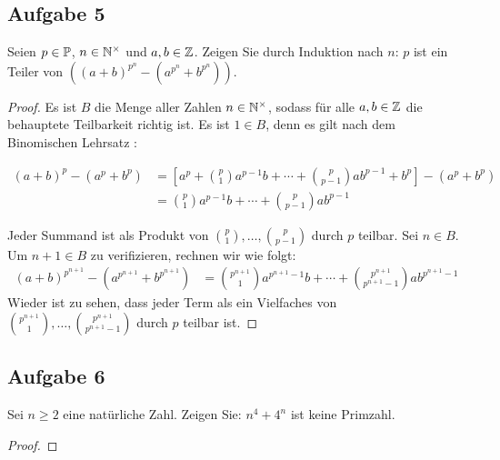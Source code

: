 \subsection{Aufgabe 5}
Seien $p \in \mathbb{P}{}$, $n \in \mathbb{N}^\times{}$ und $a,b \in \mathbb{Z}{}$. Zeigen Sie durch Induktion
nach $n$: $p$ ist ein Teiler von
$((a + b)^{p^n} - (a^{p^n} + b^{p^n}))$.
\begin{proof}
  Es ist $B$ die Menge aller Zahlen $n \in \mathbb{N}^\times{}$,
  sodass für alle $a,b \in \mathbb{Z}{}$ die behauptete Teilbarkeit richtig ist.
  Es ist $1 \in B$, denn es gilt nach dem Binomischen Lehrsatz
  \parencite[19]{book:zahlentheorie}:
  \begin{widemath}
    \begin{equation*}
      \begin{aligned}
        (a + b)^p - (a^p + b^p) & =
        \left[a^p + \binom{p}{1}a^{p-1}b + \dotsb + \binom{p}{p - 1}ab^{p-1} + b^p\right] - (a^p + b^p) \\
                                & = \binom{p}{1}a^{p-1}b + \dotsb + \binom{p}{p - 1}ab^{p-1}
      \end{aligned}
    \end{equation*}
  \end{widemath}
  Jeder Summand ist als Produkt von $\binom{p}{1},\dotsc,\binom{p}{p - 1}$ durch $p$ teilbar.
  Sei $n \in B$. Um $n + 1 \in B$ zu verifizieren, rechnen wir wie folgt:
  \begin{equation*}
    \begin{aligned}
      (a + b)^{p^{n+1}} - (a^{p^{n+1}} + b^{p^{n+1}}) & =
      \binom{p^{n+1}}{1}a^{p^{n+1}-1}b + \dotsb + \binom{p^{n+1}}{p^{n+1} - 1}ab^{p^{n+1}-1}
    \end{aligned}
  \end{equation*}
  Wieder ist zu sehen, dass jeder Term als ein Vielfaches von
  $\binom{p^{n+1}}{1},\dotsc,\binom{p^{n+1}}{p^{n+1} - 1}$ durch $p$ teilbar ist.
\end{proof}

\newpage
\subsection{Aufgabe 6}
Sei $n \geq 2$ eine natürliche Zahl. Zeigen Sie: $n^4 + 4^n$ ist keine Primzahl.
\begin{proof}
\end{proof}
